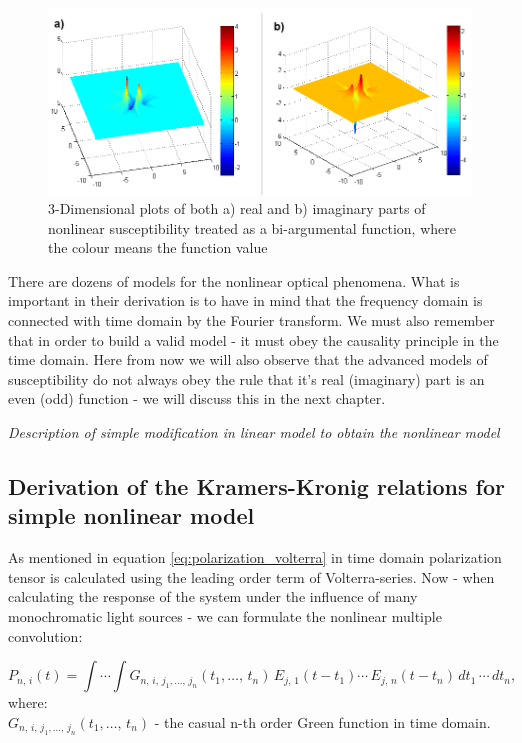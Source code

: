 \documentclass[12pt,twoside,a4paper]{article}
\numberwithin{equation}{subsection}
\numberwithin{figure}{subsection}
\begin{document}
\begin{figure} 
  \includegraphics[width=150mm]{img/fmix_3d.png}
  \caption{3-Dimensional plots of both a) real and b) imaginary parts of nonlinear susceptibility treated as a bi-argumental
  function, where the colour means the function value \label{fig:fmix_3d}}
\end{figure}

There are dozens of models for the nonlinear optical phenomena. What is important in their derivation is to have in mind that the
frequency domain is connected with time domain by the Fourier transform. We must also remember that in order to build a valid model
- it must obey the causality principle in the time domain. Here from now we will also observe that the advanced models of
susceptibility do not always obey the rule that it's real (imaginary) part is an even (odd) function - we will discuss this in the next chapter.

\textit{Description of simple modification in linear model to obtain the nonlinear model}

\subsection{Derivation of the Kramers-Kronig relations for simple nonlinear model} \label{chap:problem_dnlo}

As mentioned in equation \ref{eq:polarization_volterra} in time domain polarization tensor is calculated using the leading order
term of Volterra-series. Now - when calculating the response of the system under the influence of many monochromatic light sources
- we can formulate the nonlinear multiple convolution:

\begin{equation} \label{eq:dkk_convolution}
  {P_{n, \,i}}(t)=\int \dotsi \int {G_{n, \,i, \,j_{1},\dotsc, \,j_{n}}}(t_1,\dotsc, \, t_n )\,{E_{j,
  \,1}}(t - {t_{1}})\dotsm\,{E_{j, \,n}}(t -{t_{n}})\,d{t_{1}}\,\dotsm\,d{t_{n}},
\end{equation}
where:\\
${G_{n, \,i, \,j_{1},\dotsc, \, j_{n}}}(t_1, \dotsc, \, t_n)$ - the casual n-th order Green function in
time domain.
\end{document}
